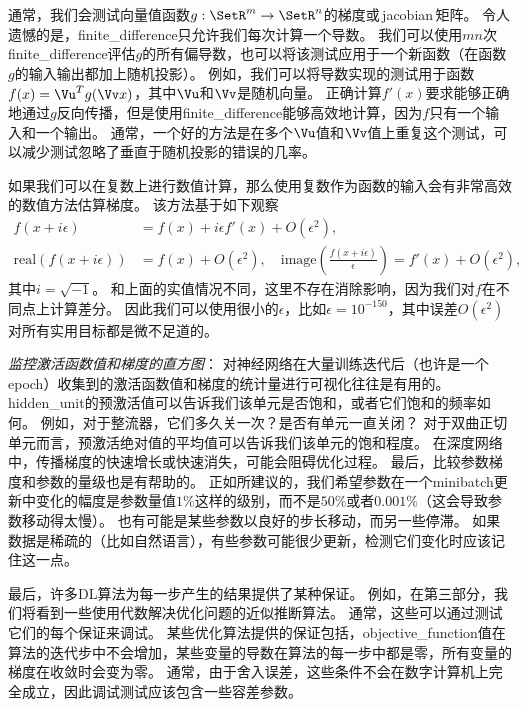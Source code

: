 
通常，我们会测试向量值函数$g:\SetR^m \to \SetR^n$的梯度或\,\gls{jacobian}\,矩阵。
令人遗憾的是，\gls{finite_difference}只允许我们每次计算一个导数。
我们可以使用$mn$次 \gls{finite_difference}评估$g$的所有偏导数，也可以将该测试应用于一个新函数（在函数$g$的输入输出都加上随机投影）。%
例如，我们可以将导数实现的测试用于函数$f(x) = \Vu^T g(\Vv x)$，其中$\Vu$和$\Vv$是随机向量。%
正确计算$f'(x)$要求能够正确地通过$g$反向传播，但是使用\gls{finite_difference}能够高效地计算，因为$f$只有一个输入和一个输出。
通常，一个好的方法是在多个$\Vu$值和$\Vv$值上重复这个测试，可以减少测试忽略了垂直于随机投影的错误的几率。%


如果我们可以在复数上进行数值计算，那么使用复数作为函数的输入会有非常高效的数值方法估算梯度\citep{Squire+Trapp-1998}。
该方法基于如下观察
\begin{align}
	f(x + i\epsilon) &= f(x) + i\epsilon f'(x) + O(\epsilon^2) ,\\
	\text{real}( f(x+i\epsilon) ) &= f(x) + O(\epsilon^2), \quad \text{image}( \frac{f(x+i\epsilon)}{ \epsilon } ) = f'(x) + O(\epsilon^2),
\end{align}
其中$i=\sqrt{-1}$。
和上面的实值情况不同，这里不存在消除影响，因为我们对$f$在不同点上计算差分。
因此我们可以使用很小的$\epsilon$，比如$\epsilon = 10^{-150}$，其中误差$O(\epsilon^2)$对所有实用目标都是微不足道的。


\emph{监控激活函数值和梯度的直方图}：
对神经网络在大量训练迭代后（也许是一个\gls{epoch}）收集到的激活函数值和梯度的统计量进行可视化往往是有用的。
\gls{hidden_unit}的预激活值可以告诉我们该单元是否饱和，或者它们饱和的频率如何。
例如，对于整流器，它们多久关一次？是否有单元一直关闭？
对于双曲正切单元而言，预激活绝对值的平均值可以告诉我们该单元的饱和程度。
在深度网络中，传播梯度的快速增长或快速消失，可能会阻碍优化过程。
最后，比较参数梯度和参数的量级也是有帮助的。
正如\citep{Bottou-DLSS2015}所建议的，我们希望参数在一个\gls{minibatch}更新中变化的幅度是参数量值$1\%$这样的级别，而不是$50\%$或者$0.001\%$（这会导致参数移动得太慢）。
也有可能是某些参数以良好的步长移动，而另一些停滞。
如果数据是稀疏的（比如自然语言），有些参数可能很少更新，检测它们变化时应该记住这一点。


最后，许多\gls{DL}算法为每一步产生的结果提供了某种保证。
例如，在第三部分，我们将看到一些使用代数解决优化问题的近似推断算法。
通常，这些可以通过测试它们的每个保证来调试。
某些优化算法提供的保证包括，\gls{objective_function}值在算法的迭代步中不会增加，某些变量的导数在算法的每一步中都是零，所有变量的梯度在收敛时会变为零。
通常，由于舍入误差，这些条件不会在数字计算机上完全成立，因此调试测试应该包含一些容差参数。

